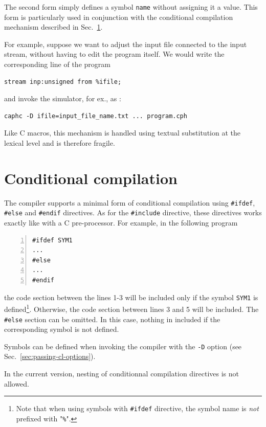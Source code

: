 The second form simply defines a symbol \verb|name| without assigning it a value. This form is
particularly used in conjunction with the conditional compilation mechanism described in
Sec.~\ref{sec:cond-comp}. 

\medskip
For example, suppose we want to adjust the input file connected to the input stream, without having
to edit the program itself.
We would write the corresponding line of the program

\begin{verbatim}
stream inp:unsigned from %ifile;
\end{verbatim}

and invoke the simulator, for ex., as :

\begin{verbatim}
caphc -D ifile=input_file_name.txt ... program.cph
\end{verbatim}

Like C macros, this mechanism is handled using textual substitution at the lexical level and is therefore
fragile.


\section{Conditional compilation}
\label{sec:cond-comp}

The compiler supports a minimal form of conditional compilation using \verb|#ifdef|, \verb|#else|
and \verb|#endif| directives. As for the \verb|#include| directive, these directives works exactly
like with a C pre-processor. For example, in the following program

\begin{lstlisting}[numbers=left]
#ifdef SYM1
...
#else
...
#endif
\end{lstlisting}

\noindent
the code section between the lines 1-3 will be included only if the symbol \verb|SYM1| is
defined\footnote{Note that when using symbols with \texttt{\#ifdef} directive, the symbol name is
  \emph{not} prefixed with "\texttt{\%}".}. Otherwise, the code section between lines 3 and 5 will be included. 
The \verb|#else| section can be omitted. In this case, nothing in included if the corresponding
symbol is not defined.

Symbols can be defined when invoking the compiler with the \verb|-D| option (see
Sec.~\ref{sec:passing-cl-options}).

In the current version, nesting of conditionnal compilation directives is not allowed.

